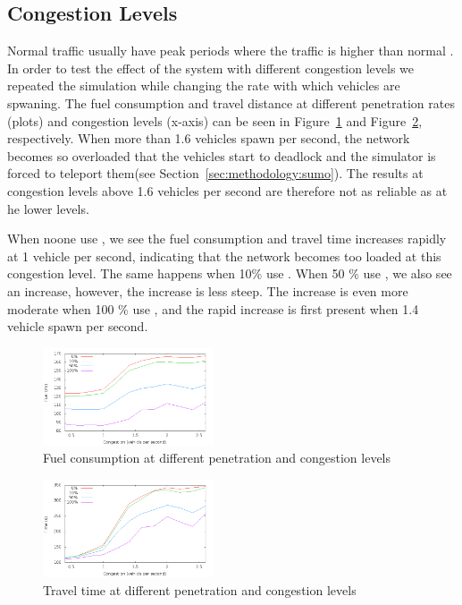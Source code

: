 \subsection{Congestion Levels}
Normal traffic usually have peak periods where the traffic is higher than normal \cite{Vejdir}. 
In order to test the effect of the system with different congestion levels we repeated the simulation while changing the rate with which vehicles are spwaning. 
The fuel consumption and travel distance at different penetration rates (plots) and congestion levels (x-axis) can be seen in Figure~\ref{fig:TestResults:congestionFuel} and Figure~\ref{fig:TestResults:congestionTime}, respectively. 
When more than 1.6 vehicles spawn per second, the network becomes so overloaded that the vehicles start to deadlock and the simulator is forced to teleport them(see Section~\ref{sec:methodology:sumo}).
The results at congestion levels above 1.6 vehicles per second are therefore not as reliable as at he lower levels.

When noone use \tech, we see the fuel consumption and travel time increases rapidly at 1 vehicle per second, indicating that the network becomes too loaded at this congestion level. 
The same happens when 10\% use \tech. 
When 50 \% use \tech, we also see an increase, however, the increase is less steep.
The increase is even more moderate when 100 \% use \tech, and the rapid increase is first present when 1.4 vehicle spawn per second.


\begin{figure}[htb]
\includegraphics[width=0.45\textwidth]{../images/fuelCongestion.png}
\caption{Fuel consumption at different penetration and congestion levels}
\label{fig:TestResults:congestionFuel}
\end{figure}
\begin{figure}[htb]
\includegraphics[width=0.45\textwidth]{../images/timeCongestion.png}
\caption{Travel time at different penetration and congestion levels}
\label{fig:TestResults:congestionTime}
\end{figure}

